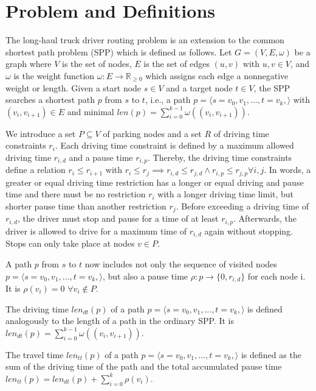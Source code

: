 \chapter{Problem and Definitions}\label{chapter:problem_definitions}
The long-haul truck driver routing problem is an extension to the common shortest path problem (SPP) which is defined as follows. Let $G=(V,E,\omega)$ be a graph where $V$ is the set of nodes, $E$ is the set of edges $(u,v)$ with $u,v \in V$, and $\omega$ is the weight function $\omega: E \rightarrow \mathbb{R}_{\ge 0}$ which assigns each edge a nonnegative weight or length. Given a start node $s \in V$ and a target node $t \in V$, the SPP searches a shortest path $p$ from $s$ to $t$, i.e., a path $p = \langle s=v_0,v_1,...,t=v_k, \rangle$ with $(v_i,v_{i+1}) \in E$ and minimal $len(p) = \sum_{i=0}^{k-1} \omega((v_{i}, v_{i+1}))$.

We introduce a set $P \subseteq V$ of parking nodes and a set $R$ of driving time constraints $r_i$. Each driving time constraint is defined by a maximum allowed driving time $r_{i,d}$ and a pause time $r_{i,p}$. Thereby, the driving time constraints define a relation $r_i \le r_{i+1}$ with $r_i \le r_j \implies r_{i,d} \le r_{j,d} \land  r_{i,p} \le r_{j,p} \forall i,j$. In words, a greater or equal driving time restriction has a longer or equal driving and pause time and there must be no restriction $r_i$ with a longer driving time limit, but shorter pause time than another restriction $r_j$. Before exceeding a driving time of $r_{i,d}$, the driver must stop and pause for a time of at least $r_{i,p}$. Afterwards, the driver is allowed to drive for a maximum time of $r_{i,d}$ again without stopping. Stops can only take place at nodes $v \in P$.

A path $p$ from $s$ to $t$ now includes not only the sequence of visited nodes $p = \langle s=v_0,v_1,...,t=v_k, \rangle$, but also a pause time $\rho: p \rightarrow \{0,r_{i,d}\}$ for each node i. It is $\rho(v_i) = 0$ $\forall v_i \notin P$.

\begin{definition}
	The driving time $len_{dt}(p)$ of a path  $p = \langle s=v_0,v_1,...,t=v_k, \rangle$ is defined analogously to the length of a path in the ordinary SPP. It is $len_{dt}(p) = \sum_{i=0}^{k-1} \omega((v_{i}, v_{i+1}))$.
\end{definition}

\begin{definition}
	The travel time $len_{tt}(p)$ of a path  $p = \langle s=v_0,v_1,...,t=v_k, \rangle$ is defined as the sum of the driving time of the path and the total accumulated pause time $len_{tt}(p) = len_{dt}(p) + \sum_{i=0}^{k} \rho(v_i)$.
\end{definition}

